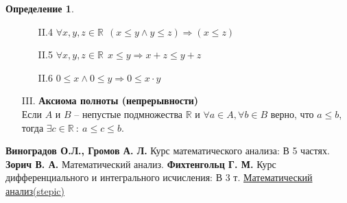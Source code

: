 \documentclass[14pt, a4paper]{article}
\theoremstyle{definition}
\newtheorem{definition}{Определение}[section]
\theoremstyle{remark}
\begin{document}
\begin{definition}
\begin{itemize}
\begin{itemize}
        \item[II.4] $\forall x, y, z \in \mathbb{R} \ \ (x \leq y \wedge  y \leq z) \Rightarrow (x \leq z)$
        \item[II.5] $\forall x, y, z \in \mathbb{R} \ \ x \leq y \Rightarrow x + z \leq y + z$
        \item[II.6] $0 \leq x \wedge 0 \leq y \Rightarrow 0 \leq x \cdot y$
    \end{itemize}
    \item[III.] \textbf{Аксиома полноты (непрерывности)} \\
        Если $A$ и $B$ -- непустые подмножества $\mathbb{R}$ и $\forall a \in A, \forall b \in B$ верно, что $a \leq b$, тогда $\exists c \in \mathbb{R} \ : \ a \leq c \leq b$.
        
\end{itemize}
\end{definition}

\begin{thebibliography}{2}
 \textbf{Виноградов О.Л., Громов А. Л.} Курс математического анализа: В 5 частях.
 \textbf{Зорич В. А.} Математический анализ.
 \textbf{Фихтенгольц Г. М.} Курс дифференциального и интегрального исчисления: В 3 т.
 \href{https://stepik.org/course/716/info}{Математический анализ(stepic)}
\end{thebibliography}
\end{document}
